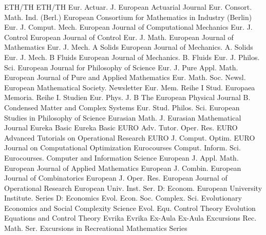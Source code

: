 {ETH/TH}
{ETH/TH}
{Eur. Actuar. J.}
{European Actuarial Journal}
{Eur. Consort. Math. Ind. (Berl.)}
{European Consortium for Mathematics in Industry (Berlin)}
{Eur. J. Comput. Mech.}
{European Journal of Computational Mechanics}
{Eur. J. Control}
{European Journal of Control}
{Eur. J. Math.}
{European Journal of Mathematics}
{Eur. J. Mech. A Solids}
{European Journal of Mechanics. A. Solids}
{Eur. J. Mech. B Fluids}
{European Journal of Mechanics. B. Fluids}
{Eur. J. Philos. Sci.}
{European Journal for Philosophy of Science}
{Eur. J. Pure Appl. Math.}
{European Journal of Pure and Applied Mathematics}
{Eur. Math. Soc. Newsl.}
{European Mathematical Society. Newsletter}
{Eur. Mem. Reihe I Stud.}
{Europaea Memoria. Reihe I. Studien}
{Eur. Phys. J. B}
{The European Physical Journal B. Condensed Matter and Complex Systems}
{Eur. Stud. Philos. Sci.}
{European Studies in Philosophy of Science}
{Eurasian Math. J.}
{Eurasian Mathematical Journal}
{Eureka Basic}
{Eureka Basic}
{EURO Adv. Tutor. Oper. Res.}
{EURO Advanced Tutorials on Operational Research}
{EURO J. Comput. Optim.}
{EURO Journal on Computational Optimization}
{Eurocourses Comput. Inform. Sci.}
{Eurocourses. Computer and Information Science}
{European J. Appl. Math.}
{European Journal of Applied Mathematics}
{European J. Combin.}
{European Journal of Combinatorics}
{European J. Oper. Res.}
{European Journal of Operational Research}
{European Univ. Inst. Ser. D: Econom.}
{European University Institute. Series D: Economics}
{Evol. Econ. Soc. Complex. Sci.}
{Evolutionary Economics and Social Complexity Science}
{Evol. Equ. Control Theory}
{Evolution Equations and Control Theory}
{Evrika}
{Evrika}
{Ex-Aula}
{Ex-Aula}
{Excursions Rec. Math. Ser.}
{Excursions in Recreational Mathematics Series}
